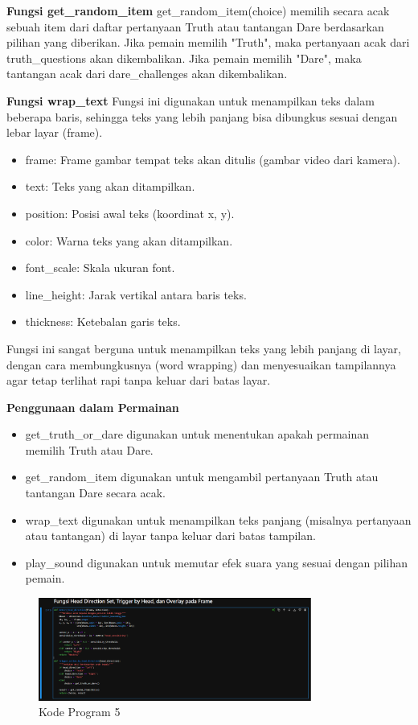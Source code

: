 \documentclass[11pt,a4paper]{article}
\begin{document}
\textbf{Fungsi get\_random\_item}
get\_random\_item(choice) memilih secara acak sebuah item dari daftar pertanyaan Truth atau tantangan Dare berdasarkan pilihan yang diberikan.
Jika pemain memilih "Truth", maka pertanyaan acak dari truth\_questions akan dikembalikan.
Jika pemain memilih "Dare", maka tantangan acak dari dare\_challenges akan dikembalikan.

\textbf{Fungsi wrap\_text}
Fungsi ini digunakan untuk menampilkan teks dalam beberapa baris, sehingga teks yang lebih panjang bisa dibungkus sesuai dengan lebar layar (frame).
\begin{itemize}
    \item frame: Frame gambar tempat teks akan ditulis (gambar video dari kamera).
    \item text: Teks yang akan ditampilkan.
    \item position: Posisi awal teks (koordinat x, y).
    \item color: Warna teks yang akan ditampilkan.
    \item font\_scale: Skala ukuran font.
    \item line\_height: Jarak vertikal antara baris teks.
    \item thickness: Ketebalan garis teks.
\end{itemize}
Fungsi ini sangat berguna untuk menampilkan teks yang lebih panjang di layar, dengan cara membungkusnya (word wrapping) dan menyesuaikan tampilannya agar tetap terlihat rapi tanpa keluar dari batas layar.

\textbf{Penggunaan dalam Permainan}
\begin{itemize}
    \item get\_truth\_or\_dare digunakan untuk menentukan apakah permainan memilih Truth atau Dare.
    \item get\_random\_item digunakan untuk mengambil pertanyaan Truth atau tantangan Dare secara acak.
    \item wrap\_text digunakan untuk menampilkan teks panjang (misalnya pertanyaan atau tantangan) di layar tanpa keluar dari batas tampilan.
    \item play\_sound digunakan untuk memutar efek suara yang sesuai dengan pilihan pemain.
\end{itemize}

\begin{figure}[H]
    \centering
    \includegraphics[width=0.8\textwidth]{5.png} %
    \caption{Kode Program 5}
    \label{fig:5}
\end{figure}
\end{document}
